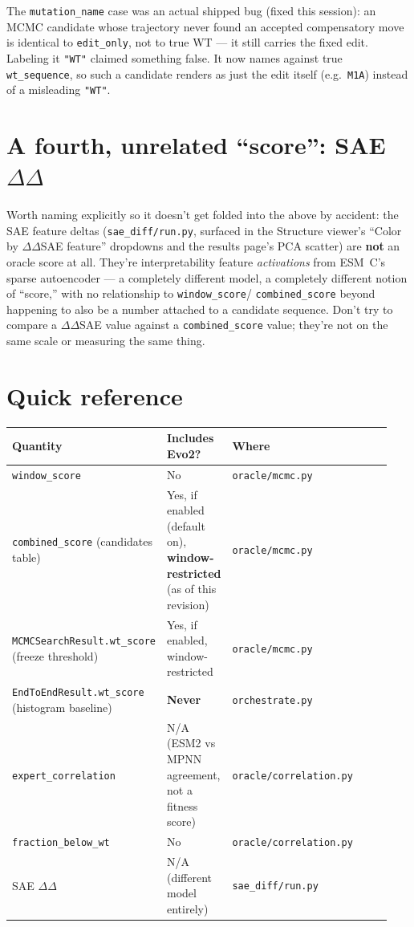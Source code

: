 \documentclass[11pt]{article}
\begin{document}
The \texttt{mutation\_name} case was an actual shipped bug (fixed this
session): an MCMC candidate whose trajectory never found an accepted
compensatory move is identical to \texttt{edit\_only}, not to true WT --- it
still carries the fixed edit. Labeling it \texttt{"WT"} claimed something
false. It now names against true \texttt{wt\_sequence}, so such a candidate
renders as just the edit itself (e.g.\ \texttt{M1A}) instead of a misleading
\texttt{"WT"}.

\section{A fourth, unrelated ``score'': SAE $\Delta\Delta$}

Worth naming explicitly so it doesn't get folded into the above by accident:
the SAE feature deltas (\texttt{sae\_diff/run.py}, surfaced in the Structure
viewer's ``Color by $\Delta\Delta$SAE feature'' dropdowns and the results
page's PCA scatter) are \textbf{not} an oracle score at all. They're
interpretability feature \emph{activations} from ESM~C's sparse autoencoder
--- a completely different model, a completely different notion of
``score,'' with no relationship to \texttt{window\_score}/
\texttt{combined\_score} beyond happening to also be a number attached to a
candidate sequence. Don't try to compare a $\Delta\Delta$SAE value against a
\texttt{combined\_score} value; they're not on the same scale or measuring
the same thing.

\section{Quick reference}

\begin{center}
\begin{tabular}{@{}p{0.28\linewidth}p{0.16\linewidth}p{0.5\linewidth}@{}}
\toprule
Quantity & Includes Evo2? & Where \\
\midrule
\texttt{window\_score} & No & \texttt{oracle/mcmc.py} \\
\texttt{combined\_score} (candidates table) & Yes, if enabled (default on), \textbf{window-restricted} (as of this revision) & \texttt{oracle/mcmc.py} \\
\texttt{MCMCSearchResult.wt\_score} (freeze threshold) & Yes, if enabled, window-restricted & \texttt{oracle/mcmc.py} \\
\texttt{EndToEndResult.wt\_score} (histogram baseline) & \textbf{Never} & \texttt{orchestrate.py} \\
\texttt{expert\_correlation} & N/A (ESM2 vs MPNN agreement, not a fitness score) & \texttt{oracle/correlation.py} \\
\texttt{fraction\_below\_wt} & No & \texttt{oracle/correlation.py} \\
SAE $\Delta\Delta$ & N/A (different model entirely) & \texttt{sae\_diff/run.py} \\
\bottomrule
\end{tabular}
\end{center}
\end{document}
